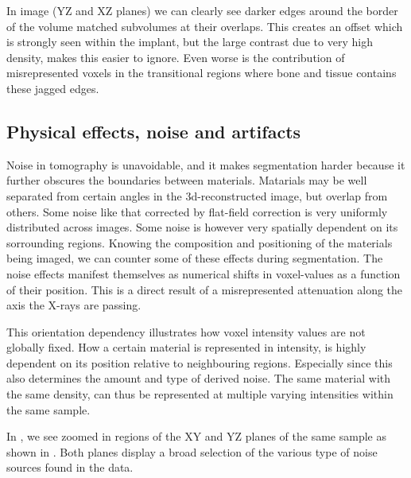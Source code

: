 In image  (YZ and XZ planes) we can clearly see darker edges around the border
of the volume matched subvolumes at their overlaps. This creates an offset which is strongly seen
within the implant, but the large contrast due to very high density, makes this easier to ignore.
Even worse is the contribution of misrepresented voxels in the transitional regions where bone and
tissue contains these jagged edges.

\subsection{Physical effects, noise and artifacts}
\label{sec:physics}

Noise in tomography is unavoidable, and it makes segmentation harder because it further obscures
the boundaries between materials. Matarials may be well separated from certain angles in the
3d-reconstructed image, but overlap from others. Some noise like that corrected by flat-field
correction is very uniformly distributed across images. Some noise is however very spatially
dependent on its sorrounding regions. Knowing the composition and positioning of the materials
being imaged, we can counter some of these effects during segmentation. The noise effects manifest
themselves as numerical shifts in voxel-values as a function of their position. This is a direct
result of a misrepresented attenuation along the axis the X-rays are passing.

This orientation dependency illustrates how voxel intensity values are not globally fixed. How a
certain material is represented in intensity, is highly dependent on its position relative to
neighbouring regions. Especially since this also determines the amount and type of derived noise.
The same material with the same density, can thus be represented at multiple varying intensities
within the same sample.


In , we see zoomed in regions of the XY and YZ planes
of the same sample as shown in .
Both planes display a broad selection of the various type of noise sources found in the data.

